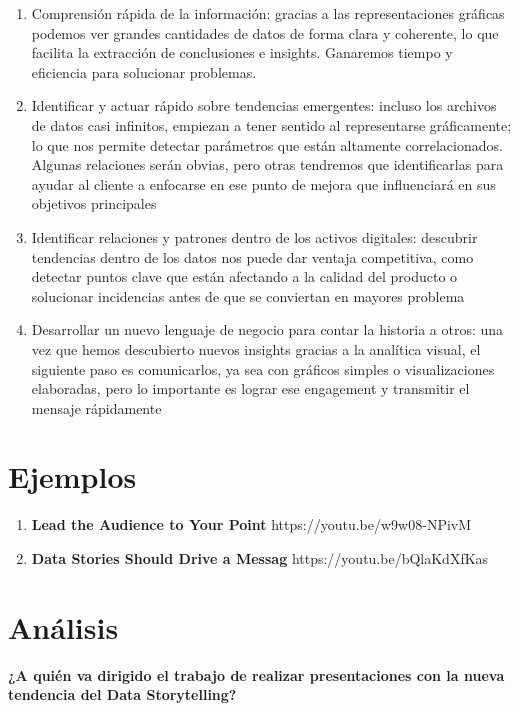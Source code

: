 \documentclass[11pt]{article}
\begin{document}
\begin{enumerate}
	\item Comprensión rápida de la información: gracias a las representaciones gráficas podemos ver grandes cantidades de datos de forma clara y coherente, lo que facilita la extracción de conclusiones e insights. Ganaremos tiempo y eficiencia para solucionar problemas.
	\item Identificar y actuar rápido sobre tendencias emergentes: incluso los archivos de datos casi infinitos, empiezan a tener sentido al representarse gráficamente; lo que nos permite detectar parámetros que están altamente correlacionados. Algunas relaciones serán obvias, pero otras tendremos que identificarlas para ayudar al cliente a enfocarse en ese punto de mejora que influenciará en sus objetivos principales
	\item Identificar relaciones y patrones dentro de los activos digitales: descubrir tendencias dentro de los datos nos puede dar ventaja competitiva, como detectar puntos clave que están afectando a la calidad del producto o solucionar incidencias antes de que se conviertan en mayores problema
	\item Desarrollar un nuevo lenguaje de negocio para contar la historia a otros: una vez que hemos descubierto nuevos insights gracias a la analítica visual, el siguiente paso es comunicarlos, ya sea con gráficos simples o visualizaciones elaboradas, pero lo importante es lograr ese engagement y transmitir el mensaje rápidamente
\end{enumerate}




\section{Ejemplos}
\begin{enumerate}
    \item \textbf{Lead the Audience to Your Point}
    https://youtu.be/w9w08-NPivM
    \item \textbf{Data Stories Should Drive a Messag}
    https://youtu.be/bQlaKdXfKas
\end{enumerate}


\section{Análisis}

{\bf ¿A quién va dirigido el trabajo de realizar presentaciones con la nueva tendencia del Data Storytelling? }
\end{document}
